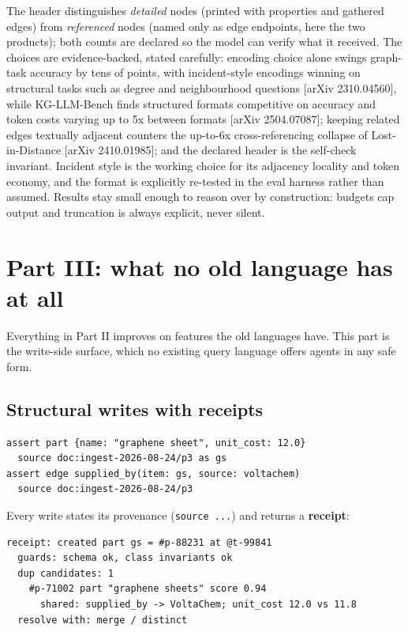 \documentclass[11pt]{article}
\begin{document}
The header distinguishes \emph{detailed} nodes (printed with properties and gathered edges) from \emph{referenced} nodes (named only as edge endpoints, here the two products); both counts are declared so the model can verify what it received. The choices are evidence-backed, stated carefully: encoding choice alone swings graph-task accuracy by tens of points, with incident-style encodings winning on structural tasks such as degree and neighbourhood questions [arXiv 2310.04560], while KG-LLM-Bench finds structured formats competitive on accuracy and token costs varying up to 5x between formats [arXiv 2504.07087]; keeping related edges textually adjacent counters the up-to-6x cross-referencing collapse of Lost-in-Distance [arXiv 2410.01985]; and the declared header is the self-check invariant. Incident style is the working choice for its adjacency locality and token economy, and the format is explicitly re-tested in the eval harness rather than assumed. Results stay small enough to reason over by construction: budgets cap output and truncation is always explicit, never silent.

\section{Part III: what no old language has at all}

Everything in Part II improves on features the old languages have. This part is the write-side surface, which no existing query language offers agents in any safe form.

\subsection{Structural writes with receipts}

\begin{lstlisting}[style=new]
assert part {name: "graphene sheet", unit_cost: 12.0}
  source doc:ingest-2026-08-24/p3 as gs
assert edge supplied_by(item: gs, source: voltachem)
  source doc:ingest-2026-08-24/p3
\end{lstlisting}

Every write states its provenance (\texttt{source ...}) and returns a \textbf{receipt}:

\begin{lstlisting}[style=result]
receipt: created part gs = #p-88231 at @t-99841
  guards: schema ok, class invariants ok
  dup candidates: 1
    #p-71002 part "graphene sheets" score 0.94
      shared: supplied_by -> VoltaChem; unit_cost 12.0 vs 11.8
  resolve with: merge / distinct
\end{lstlisting}
\end{document}
